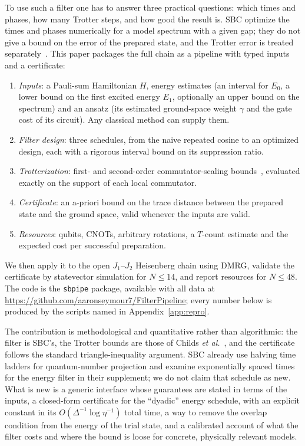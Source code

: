 \documentclass[aps,pra,twocolumn,superscriptaddress,nofootinbib]{revtex4-2}
\begin{document}
To use such a filter one has to answer three practical questions: which times and phases, how many
Trotter steps, and how good the result is. SBC optimize the times and phases numerically for a model
spectrum with a given gap; they do not give a bound on the error of the prepared state, and the
Trotter error is treated separately~\cite{Stetcu2023}. This paper packages the full chain as a pipeline
with typed inputs and a certificate:
\begin{enumerate}
\item \emph{Inputs}: a Pauli-sum Hamiltonian $H$, energy estimates (an interval for $E_0$, a lower
  bound on the first excited energy $E_1$, optionally an upper bound on the spectrum) and an ansatz
  (its estimated ground-space weight $\gamma$ and the gate cost of its circuit). Any classical method
  can supply them.
\item \emph{Filter design}: three schedules, from the naive repeated cosine to an optimized design,
  each with a rigorous interval bound on its suppression ratio.
\item \emph{Trotterization}: first- and second-order commutator-scaling bounds~\cite{Childs2021},
  evaluated exactly on the support of each local commutator.
\item \emph{Certificate}: an a-priori bound on the trace distance between the prepared state and the
  ground space, valid whenever the inputs are valid.
\item \emph{Resources}: qubits, CNOTs, arbitrary rotations, a $T$-count estimate and the expected cost
  per successful preparation.
\end{enumerate}
We then apply it to the open $J_1$--$J_2$ Heisenberg chain using DMRG, validate the certificate by
statevector simulation for $N\le14$, and report resources for $N\le48$. The code is the \texttt{sbpipe}
package, available with all data at \url{https://github.com/aaronseymour7/FilterPipeline}; every number below is produced by the scripts named in
Appendix~\ref{app:repro}.

The contribution is methodological and quantitative rather than algorithmic: the filter is SBC's, the
Trotter bounds are those of Childs \emph{et al.}~\cite{Childs2021}, and the certificate follows the
standard triangle-inequality argument. SBC already use halving time ladders for quantum-number
projection and examine exponentially spaced times for the energy filter in their supplement; we do not
claim that schedule as new. What is new is a generic interface whose guarantees are stated in terms of
the inputs, a closed-form certificate for the ``dyadic'' energy schedule, with an explicit constant in its
$O(\Delta^{-1}\log\eta^{-1})$ total time, a way to remove the overlap condition from the energy of the
trial state, and a calibrated account of what the filter costs and where the bound is loose for concrete,
physically relevant models.
\end{document}
